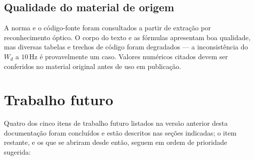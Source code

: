\documentclass[11pt,a4paper]{article}
\newcommand{\unit}[2]{\ensuremath{#1\,\mathrm{#2}}}
\begin{document}
\subsection{Qualidade do material de origem}

A norma e o código-fonte foram consultados a partir de extração por
reconhecimento óptico. O corpo do texto e as fórmulas apresentam boa qualidade,
mas diversas tabelas e trechos de código foram degradados --- a inconsistência
do $W_d$ a \unit{10}{Hz} é provavelmente um caso. Valores numéricos citados
devem ser conferidos no material original antes de uso em publicação.

\section{Trabalho futuro}

Quatro dos cinco itens de trabalho futuro listados na versão anterior desta
documentação foram concluídos e estão descritos nas seções indicadas; o item
restante, e os que se abriram desde então, seguem em ordem de prioridade
sugerida:
\end{document}
